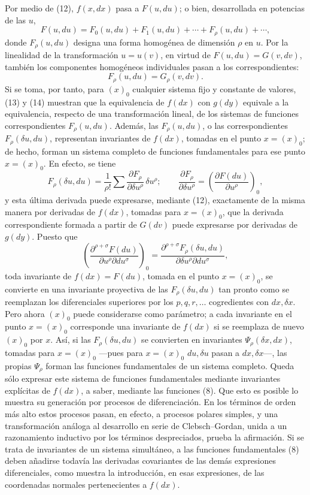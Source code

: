 \documentclass[11pt]{article}
\begin{document}
Por medio de (12), \(f(x,dx)\) pasa a \(F(u,du)\); o bien, desarrollada en
potencias de las \(u\),
\begin{equation}
F(u,du)=F_0(u,du)+F_1(u,du)+\cdots+F_\rho(u,du)+\cdots,
\tag{13}
\end{equation}
donde \(F_\rho(u,du)\) designa una forma homogénea de dimensión \(\rho\) en
\(u\). Por la linealidad de la transformación \(u=u(v)\), en virtud de
\(F(u,du)=G(v,dv)\), también los componentes homogéneos individuales pasan a
los correspondientes:
\begin{equation}
F_\rho(u,du)=G_\rho(v,dv).
\tag{14}
\end{equation}
Si se toma, por tanto, para \((x)_0\) cualquier sistema fijo y constante de
valores, (13) y (14) muestran que la equivalencia de \(f(dx)\) con \(g(dy)\)
equivale a la equivalencia, respecto de una transformación lineal, de los
sistemas de funciones correspondientes \(F_\rho(u,du)\). Además, las
\(F_\rho(u,du)\), o las correspondientes \(F_\rho(\delta u,du)\), representan
invariantes de \(f(dx)\), tomadas en el punto \(x=(x)_0\); de hecho, forman un
sistema completo de funciones fundamentales para ese punto \(x=(x)_0\). En
efecto, se tiene
\[
F_\rho(\delta u,du)=\frac1{\rho!}\sum
\frac{\partial F_\rho}{\partial \delta u^\rho}\,\delta u^\rho;
\qquad
\frac{\partial F_\rho}{\partial \delta u^\rho}
=\left(\frac{\partial F(du)}{\partial u^\rho}\right)_0,
\]
y esta última derivada puede expresarse, mediante (12), exactamente de la misma
manera por derivadas de \(f(dx)\), tomadas para \(x=(x)_0\), que la derivada
correspondiente formada a partir de \(G(dv)\) puede expresarse por derivadas de
\(g(dy)\). Puesto que
\[
\left(\frac{\partial^{\rho+\sigma}F(du)}
{\partial u^\rho\partial du^\sigma}\right)_0
=
\frac{\partial^{\rho+\sigma}F_\rho(\delta u,du)}
{\partial\delta u^\rho\partial du^\sigma},
\]
toda invariante de \(f(dx)=F(du)\), tomada en el punto \(x=(x)_0\), se convierte
en una invariante proyectiva de las \(F_\rho(\delta u,du)\) tan pronto como se
reemplazan los diferenciales superiores por los \(p,q,r,\ldots\) cogredientes
con \(dx,\delta x\). Pero ahora \((x)_0\) puede considerarse como parámetro; a
cada invariante en el punto \(x=(x)_0\) corresponde una invariante de \(f(dx)\)
si se reemplaza de nuevo \((x)_0\) por \(x\). Así, si las
\(F_\rho(\delta u,du)\) se convierten en invariantes
\(\Psi_\rho(\delta x,dx)\), tomadas para \(x=(x)_0\) ---pues para \(x=(x)_0\)
\(du,\delta u\) pasan a \(dx,\delta x\)---, las propias \(\Psi_\rho\) forman las
funciones fundamentales de un sistema completo. Queda sólo expresar este sistema
de funciones fundamentales mediante invariantes explícitas de \(f(dx)\), a saber,
mediante las funciones (8). Que esto es posible lo muestra su generación por
procesos de diferenciación. En los términos de orden más alto estos procesos
pasan, en efecto, a procesos polares simples, y una transformación análoga al
desarrollo en serie de Clebsch--Gordan, unida a un razonamiento inductivo por
los términos despreciados, prueba la afirmación. Si se trata de invariantes de
un sistema simultáneo, a las funciones fundamentales (8) deben añadirse todavía
las derivadas covariantes de las demás expresiones diferenciales, como muestra
la introducción, en esas expresiones, de las coordenadas normales pertenecientes
a \(f(dx)\).
\end{document}

